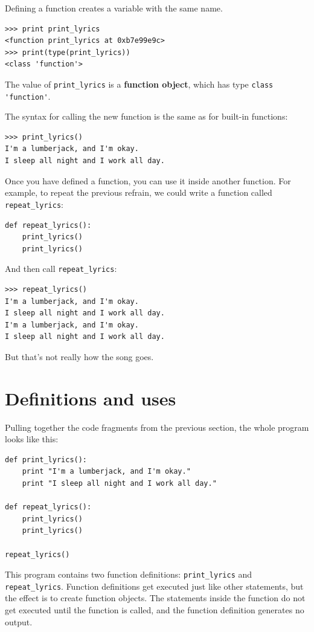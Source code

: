 \documentclass[10pt]{book}
\begin{document}
Defining a function creates a variable with the same name.

\beforeverb
\begin{verbatim}
>>> print print_lyrics
<function print_lyrics at 0xb7e99e9c>
>>> print(type(print_lyrics))
<class 'function'>
\end{verbatim}
\afterverb
%
The value of \verb"print_lyrics" is a {\bf function object}, which
has type \verb"class 'function'".


The syntax for calling the new function is the same as
for built-in functions:

\beforeverb
\begin{verbatim}
>>> print_lyrics()
I'm a lumberjack, and I'm okay.
I sleep all night and I work all day.
\end{verbatim}
\afterverb
%
Once you have defined a function, you can use it inside another
function.  For example, to repeat the previous refrain, we could write
a function called \verb"repeat_lyrics":

\beforeverb
\begin{verbatim}
def repeat_lyrics():
    print_lyrics()
    print_lyrics()
\end{verbatim}
\afterverb
%
And then call \verb"repeat_lyrics":

\beforeverb
\begin{verbatim}
>>> repeat_lyrics()
I'm a lumberjack, and I'm okay.
I sleep all night and I work all day.
I'm a lumberjack, and I'm okay.
I sleep all night and I work all day.
\end{verbatim}
\afterverb
%
But that's not really how the song goes.


\section{Definitions and uses}

Pulling together the code fragments from the previous section, the
whole program looks like this:

\beforeverb
\begin{verbatim}
def print_lyrics():
    print "I'm a lumberjack, and I'm okay."
    print "I sleep all night and I work all day."

def repeat_lyrics():
    print_lyrics()
    print_lyrics()

repeat_lyrics()
\end{verbatim}
\afterverb
%
This program contains two function definitions: \verb"print_lyrics" and
\verb"repeat_lyrics".  Function definitions get executed just like other
statements, but the effect is to create function objects.  The statements
inside the function do not get executed until the function is called, and
the function definition generates no output.
\end{document}

